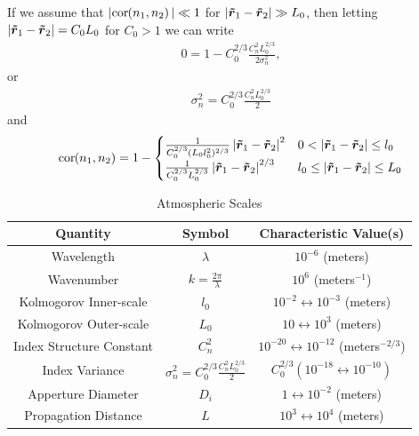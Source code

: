 If we assume that $|\cor{n_1,n_2}| \ll 1$ for $ \left|\mbox{\boldmath{$\tilde{r}$}}_1-\mbox{\boldmath{$\tilde{r}$}}_{2}\right| \gg L_0$, 
then letting $\left|\mbox{\boldmath{$\tilde{r}$}}_1-\mbox{\boldmath{$\tilde{r}$}}_{2}\right| = C_0 L_0$ for $C_0 > 1$ we can write
\begin{equation}
\begin{split}
  0 = 1 - C_0^{2/3} \frac{C_n^2 L_0^{2/3}}{2\sigma_n^2},
\end{split}
\end{equation}
or 
\begin{equation}
\begin{split}
  \sigma_n^2 =  C_0^{2/3} \frac{C_n^2 L_0^{2/3}}{2} 
\end{split}
\end{equation}
and
\begin{equation}
  \cor{n_1,n_2} = 1 - 
    \begin{cases}
        \frac{1}{C_0^{2/3}(L_0l_{0}^2)^{2/3}}\left|\vect{\dim{r}}_1-\vect{\dim{r}}_{2}\right|^{2} & 0 < \left|\vect{\dim{r}}_1-\vect{\dim{r}}_{2}\right| \leq l_{0} \\
        \frac{1}{C_0^{2/3}L_0^{2/3}} \left|\vect{\dim{r}}_1-\vect{\dim{r}}_{2}\right|^{2/3} &  l_{0}  \leq \left|\vect{\dim{r}}_1-\vect{\dim{r}}_{2}\right| \leq  L_{0}  \\
   \end{cases}
\end{equation}

\begin{table}[htp]
\begin{center}
\begin{tabular}{|c|c|c|}
\hline
Quantity                 & Symbol                    & Characteristic Value(s)  \\       
\hline
\hline
Wavelength               & $\lambda $                & $10^{-6} $ (meters)      \\                   
\hline
Wavenumber               & $k= \frac{2\pi}{\lambda}$ & $10^{6} $ (meters$^{-1}$)\\            
\hline
Kolmogorov Inner-scale   & $l_0$                     & $10^{-2} \leftrightarrow 10^{-3}$ (meters)       \\             
\hline
Kolmogorov Outer-scale   & $L_0$                     & $10 \leftrightarrow  10^{3}$ (meters)        \\            
\hline
Index Structure Constant & $C_n^2$                   & $10^{-20}\leftrightarrow 10^{-12}$ (meters$^{-2/3}$) \\
\hline
Index Variance           & $\sigma_n^2 =  C_0^{2/3} \frac{C_n^2 L_0^{2/3}}{2} $              & $C_0^{2/3} (10^{-18}\leftrightarrow 10^{-10})$ \\     
\hline
Apperture Diameter       & $D_{i}$                   & $1\leftrightarrow 10^{-2}$ (meters)     \\            
\hline
Propagation Distance     & $L$                       & $10^{3}\leftrightarrow 10^{4}$ (meters) \\     
\hline     
\end{tabular}
\end{center}
\caption{Atmospheric Scales}
\label{Atmospheric Scales}
\end{table}


